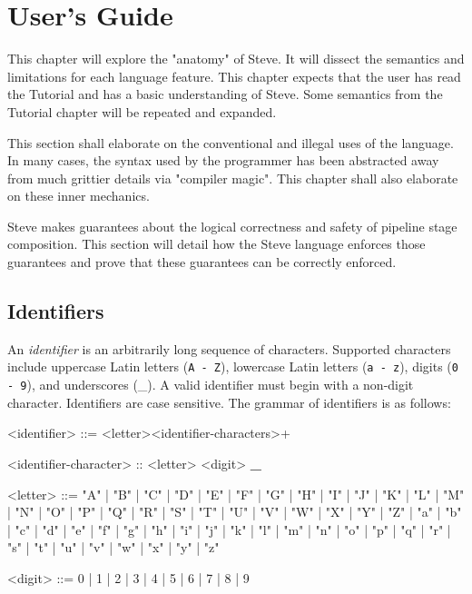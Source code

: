 \chapter{User's Guide} \label{users_guide}

This chapter will explore the "anatomy" of Steve. It will dissect the semantics and limitations for each language feature. This chapter expects that the user has read the Tutorial and has a basic understanding of Steve. Some semantics from the Tutorial chapter will be repeated and expanded.

This section shall elaborate on the conventional and illegal uses of the language. In many cases, the syntax used by the programmer has been abstracted away from much grittier details via "compiler magic". This chapter shall also elaborate on these inner mechanics.

Steve makes guarantees about the logical correctness and safety of pipeline stage composition. This section will detail how the Steve language enforces those guarantees and prove that these guarantees can be correctly enforced.

\section{Identifiers} \label{identifiers_guide}

An \textit{identifier} is an arbitrarily long sequence of characters. Supported characters include uppercase Latin letters (\texttt{A - Z}), lowercase Latin letters (\texttt{a - z}), digits (\texttt{0 - 9}), and underscores (\_). A valid identifier must begin with a non-digit character. Identifiers are case sensitive. The grammar of identifiers is as follows:

\begin{minip}
\begin{grammar}
<identifier> ::= <letter><identifier-characters>+

<identifier-character> :: <letter>
\alt <digit>
\alt \textbf{\_}

<letter> ::= "A" | "B" | "C" | "D" | "E" | "F" | "G"
       | "H" | "I" | "J" | "K" | "L" | "M" | "N"
       | "O" | "P" | "Q" | "R" | "S" | "T" | "U"
       | "V" | "W" | "X" | "Y" | "Z" | "a" | "b"
       | "c" | "d" | "e" | "f" | "g" | "h" | "i"
       | "j" | "k" | "l" | "m" | "n" | "o" | "p"
       | "q" | "r" | "s" | "t" | "u" | "v" | "w"
       | "x" | "y" | "z"

<digit> ::= 0 | 1 | 2 | 3 | 4 | 5 | 6 | 7 | 8 | 9
\end{grammar}
\end{minip}

